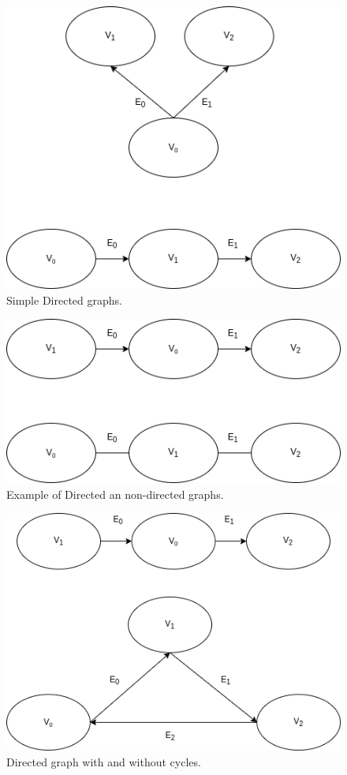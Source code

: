 \begin{figure}[h]
    \centering
    \includegraphics[scale=0.5]{figs/SimpleGraph.png}
    \caption{Simple Directed graphs.}
    \label{fig:DAG}
\end{figure}

\begin{figure}[h]
    \centering
    \includegraphics[scale=0.5]{figs/DAGvsAG.png}
    \caption{Example of Directed an non-directed graphs.}
    \label{fig:DAGvsAG}
\end{figure}

\begin{figure}[h]
    \centering
    \includegraphics[scale=0.5]{figs/DAGvsDG}
    \caption{Directed graph with and without cycles.}
    \label{fig:DAGvsDG}
\end{figure}


